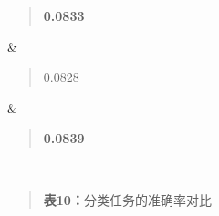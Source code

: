 \documentclass[UTF8]{ctexart}
\begin{document}
{\begin{longtable}[]
\begin{minipage}[t]{\linewidth}
\begin{quote}
\textbf{0.0833}
\end{quote}
\end{minipage} & \begin{minipage}[t]{\linewidth}\raggedright
\begin{quote}
0.0828
\end{quote}
\end{minipage} & \begin{minipage}[t]{\linewidth}\raggedright
\begin{quote}
\textbf{0.0839}
\end{quote}
\end{minipage} \\
\end{longtable}
}

\begin{quote}
\textbf{表10：}分类任务的准确率对比
\end{quote}
\end{document}
